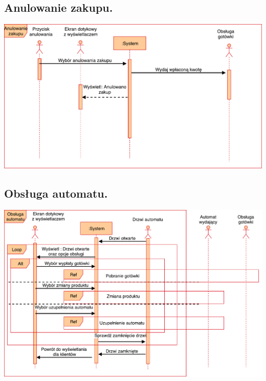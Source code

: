 \documentclass[11pt]{article}
\begin{document}
		\subsection{Anulowanie zakupu.}
		\begin{center}
			\includegraphics[scale=0.65]{AnulowanieZakupu.pdf}
		\end{center}
		\newpage
		\subsection{Obsługa automatu.}
		\begin{center}
			\includegraphics[scale=0.65]{ObslugaAutomatu.pdf}
		\end{center}
\end{document}
